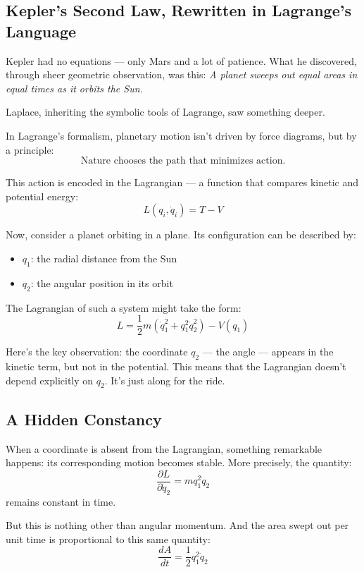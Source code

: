     \subsection{Kepler’s Second Law, Rewritten in Lagrange’s Language}

Kepler had no equations — only Mars and a lot of patience.  
What he discovered, through sheer geometric observation, was this:  
\textit{A planet sweeps out equal areas in equal times as it orbits the Sun.}

Laplace, inheriting the symbolic tools of Lagrange, saw something deeper.

\medskip

In Lagrange’s formalism, planetary motion isn’t driven by force diagrams, but by a principle:
\[
\text{Nature chooses the path that minimizes action.}
\]

This action is encoded in the Lagrangian — a function that compares kinetic and potential energy:
\[
L(q_i, \dot{q}_i) = T - V
\]

Now, consider a planet orbiting in a plane. Its configuration can be described by:
\begin{itemize}
    \item \( q_1 \): the radial distance from the Sun
    \item \( q_2 \): the angular position in its orbit
\end{itemize}

The Lagrangian of such a system might take the form:
\[
L = \frac{1}{2} m \left( \dot{q}_1^2 + q_1^2 \dot{q}_2^2 \right) - V(q_1)
\]

Here’s the key observation: the coordinate \( q_2 \) — the angle — appears in the kinetic term, but not in the potential.  
This means that the Lagrangian doesn’t depend explicitly on \( q_2 \). It’s just along for the ride.

\subsection{A Hidden Constancy}

When a coordinate is absent from the Lagrangian, something remarkable happens: its corresponding motion becomes stable.  
More precisely, the quantity:
\[
\frac{\partial L}{\partial \dot{q}_2} = m q_1^2 \dot{q}_2
\]
remains constant in time.

But this is nothing other than angular momentum. And the area swept out per unit time is proportional to this same quantity:
\[
\frac{dA}{dt} = \frac{1}{2} q_1^2 \dot{q}_2
\]

